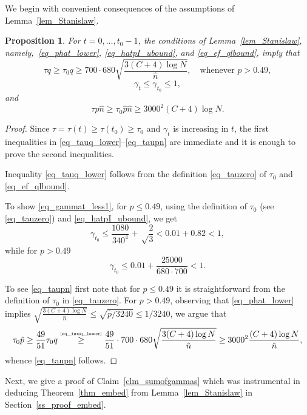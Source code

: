 \documentclass[12pt,reqno]{amsart}
\newtheorem{proposition}[theorem]{Proposition}
\theoremstyle{definition}
\newcommand{\By}[2]{\overset{\mbox{\tiny\ensuremath{#1}}}{#2}}
\begin{document}
\medskip

We begin with convenient consequences of the assumptions of Lemma~\ref{lem_Stanislaw}.
\begin{proposition}\label{tech}
  For $t = 0, \dots,  t_0 - 1$,  the conditions of Lemma~\ref{lem_Stanislaw}, namely,~\eqref{eq_phat_lower}, \eqref{eq_hatpI_ubound}, and \eqref{eq_ef_qlbound}, imply that
  \begin{equation}
    \label{eq_tauq_lower}
	  \tau q \ge \tau_0 q \ge 700 \cdot 680 \sqrt{\frac{3(C+4)\log N}{\hat n}}, \quad \text{whenever } p > 0.49,
  \end{equation}
  \begin{equation}
    \label{eq_gammat_less1}
    \gamma_t \le \gamma_{t_0}\le 1,
  \end{equation}
and
\begin{equation}
  \label{eq_taupn}
	\tau \hat p \hat n \ge \tau_0 \hat p\hat n \ge 3000^2(C + 4)\log N.
\end{equation}
\end{proposition}
\begin{proof}
  Since $\tau = \tau(t) \ge \tau(t_0) \ge \tau_0$ and $\gamma_t$ is increasing in $t$, the first inequalities in \eqref{eq_tauq_lower}--\eqref{eq_taupn} are immediate and it is enough to prove the second inequalities.

	Inequality \eqref{eq_tauq_lower} follows from the definition \eqref{eq_tauzero} of $\tau_0$ and \eqref{eq_ef_qlbound}.

  To show \eqref{eq_gammat_less1}, for $p\le0.49$, using the definition of $\tau_0$ (see \eqref{eq_tauzero}) and \eqref{eq_hatpI_ubound}, we get
  \[
	  \gamma_{t_0} \le \frac{1080}{340^4} + \sqrt\frac23 < 0.01 + 0.82 < 1,
  \]
  while for $p > 0.49$
  \[
	  \gamma_{t_0} \le 0.01 + \frac{25000}{680 \cdot 700} < 1.
  \]

  To see \eqref{eq_taupn} first note that for $p \le 0.49$ it is straightforward from the definition of $\tau_0$ in \eqref{eq_tauzero}. For $p > 0.49$,
  observing that \eqref{eq_phat_lower} implies $\sqrt{\tfrac{3(C+4)\log N}{\hat{n}}} \le \sqrt{\hat p /3240} \le 1/3240$, we argue that
\[
	\tau_0 \hat p\ge \frac{49}{51}\tau_0 q \By{\eqref{eq_tauq_lower}}{\ge} \frac{49}{51}\cdot 700\cdot 680\sqrt{\frac{3(C+4)\log N}{\hat{n}}} \ge 3000^2\frac{(C+4)\log N}{\hat{n}} ,
\]
whence \eqref{eq_taupn} follows.
\end{proof}
\medskip

Next, we give a proof of Claim~\ref{clm_sumofgammas} which was instrumental in deducing Theorem~\ref{thm_embed} from Lemma~\ref{lem_Stanislaw} in Section~\ref{ss_proof_embed}.
\end{document}
